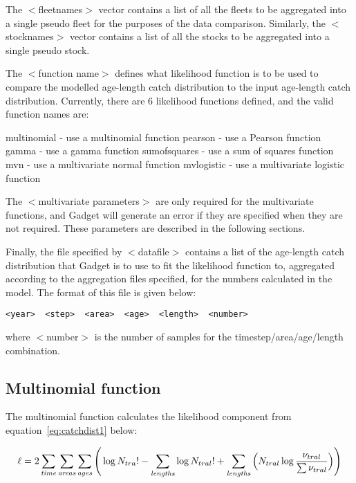 \documentclass [a4paper, 10pt]{book}
\begin{document}
\bigskip
The $<$fleetnames$>$ vector contains a list of all the fleets to be aggregated into a single pseudo fleet for the purposes of the data comparison.  Similarly, the $<$stocknames$>$ vector contains a list of all the stocks to be aggregated into a single pseudo stock.

\bigskip
The $<$function name$>$ defines what likelihood function is to be used to compare the modelled age-length catch distribution to the input age-length catch distribution.  Currently, there are 6 likelihood functions defined, and the valid function names are:

\bigskip
multinomial - use a multinomial function\newline
pearson - use a Pearson function\newline
gamma - use a gamma function\newline
sumofsquares - use a sum of squares function\newline
mvn - use a multivariate normal function\newline
mvlogistic - use a multivariate logistic function

\bigskip
The $<$multivariate parameters$>$ are only required for the multivariate functions, and Gadget will generate an error if they are specified when they are not required.  These parameters are described in the following sections.

\bigskip
Finally, the file specified by $<$datafile$>$ contains a list of the age-length catch distribution that Gadget is to use to fit the likelihood function to, aggregated according to the aggregation files specified, for the numbers calculated in the model.  The format of this file is given below:

{\small\begin{verbatim}
<year>  <step>  <area>  <age>  <length>  <number>
\end{verbatim}}

where $<$number$>$ is the number of samples for the timestep/area/age/length combination.

\subsection{Multinomial function}
The multinomial function calculates the likelihood component from equation~\ref{eq:catchdist1} below:

\begin{equation}\label{eq:catchdist1}
\ell = 2 \sum_{\it time}\sum_{\it areas}\sum_{\it ages} \Bigg( \log N_{tra}! - \sum_{\it lengths} \log N_{tral}! + \sum_{\it lengths} \Big( N_{tral} \log {\frac{\nu_{tral}}{\sum \nu_{tral}}} \Big)\Bigg)
\end{equation}
\end{document}
